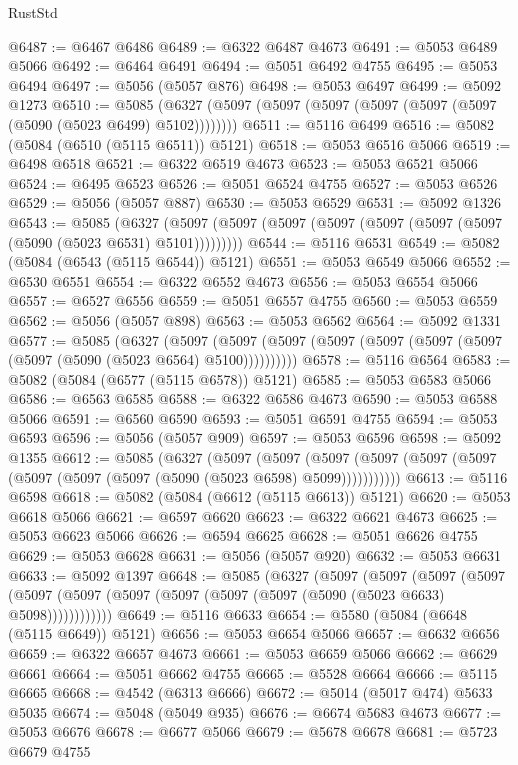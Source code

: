 \begin{lexlean}{RustStd}
\begin{coremodule}
@6487 := @6467 @6486
@6489 := @6322 @6487 @4673
@6491 := @5053 @6489 @5066
@6492 := @6464 @6491
@6494 := @5051 @6492 @4755
@6495 := @5053 @6494
@6497 := @5056 (@5057 @876)
@6498 := @5053 @6497
@6499 := @5092 @1273
@6510 := @5085 (@6327 (@5097 (@5097 (@5097 (@5097 (@5097 (@5097 (@5090 (@5023 @6499) @5102))))))))
@6511 := @5116 @6499
@6516 := @5082 (@5084 (@6510 (@5115 @6511)) @5121)
@6518 := @5053 @6516 @5066
@6519 := @6498 @6518
@6521 := @6322 @6519 @4673
@6523 := @5053 @6521 @5066
@6524 := @6495 @6523
@6526 := @5051 @6524 @4755
@6527 := @5053 @6526
@6529 := @5056 (@5057 @887)
@6530 := @5053 @6529
@6531 := @5092 @1326
@6543 := @5085
    (@6327 (@5097 (@5097 (@5097 (@5097 (@5097 (@5097 (@5097 (@5090 (@5023 @6531) @5101)))))))))
@6544 := @5116 @6531
@6549 := @5082 (@5084 (@6543 (@5115 @6544)) @5121)
@6551 := @5053 @6549 @5066
@6552 := @6530 @6551
@6554 := @6322 @6552 @4673
@6556 := @5053 @6554 @5066
@6557 := @6527 @6556
@6559 := @5051 @6557 @4755
@6560 := @5053 @6559
@6562 := @5056 (@5057 @898)
@6563 := @5053 @6562
@6564 := @5092 @1331
@6577 := @5085
    (@6327
      (@5097 (@5097 (@5097 (@5097 (@5097 (@5097 (@5097 (@5097 (@5090 (@5023 @6564) @5100))))))))))
@6578 := @5116 @6564
@6583 := @5082 (@5084 (@6577 (@5115 @6578)) @5121)
@6585 := @5053 @6583 @5066
@6586 := @6563 @6585
@6588 := @6322 @6586 @4673
@6590 := @5053 @6588 @5066
@6591 := @6560 @6590
@6593 := @5051 @6591 @4755
@6594 := @5053 @6593
@6596 := @5056 (@5057 @909)
@6597 := @5053 @6596
@6598 := @5092 @1355
@6612 := @5085
    (@6327
      (@5097
        (@5097
          (@5097 (@5097 (@5097 (@5097 (@5097 (@5097 (@5097 (@5090 (@5023 @6598) @5099)))))))))))
@6613 := @5116 @6598
@6618 := @5082 (@5084 (@6612 (@5115 @6613)) @5121)
@6620 := @5053 @6618 @5066
@6621 := @6597 @6620
@6623 := @6322 @6621 @4673
@6625 := @5053 @6623 @5066
@6626 := @6594 @6625
@6628 := @5051 @6626 @4755
@6629 := @5053 @6628
@6631 := @5056 (@5057 @920)
@6632 := @5053 @6631
@6633 := @5092 @1397
@6648 := @5085
    (@6327
      (@5097
        (@5097
          (@5097
            (@5097 (@5097 (@5097 (@5097 (@5097 (@5097 (@5097 (@5090 (@5023 @6633) @5098))))))))))))
@6649 := @5116 @6633
@6654 := @5580 (@5084 (@6648 (@5115 @6649)) @5121)
@6656 := @5053 @6654 @5066
@6657 := @6632 @6656
@6659 := @6322 @6657 @4673
@6661 := @5053 @6659 @5066
@6662 := @6629 @6661
@6664 := @5051 @6662 @4755
@6665 := @5528 @6664
@6666 := @5115 @6665
@6668 := @4542 (@6313 @6666)
@6672 := @5014 (@5017 @474) @5633 @5035
@6674 := @5048 (@5049 @935)
@6676 := @6674 @5683 @4673
@6677 := @5053 @6676
@6678 := @6677 @5066
@6679 := @5678 @6678
@6681 := @5723 @6679 @4755

\end{coremodule}
\end{lexlean}
